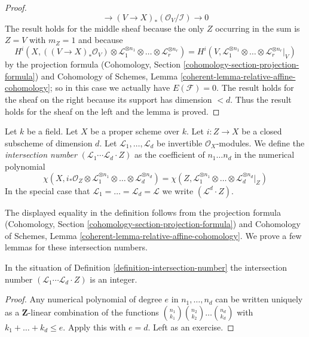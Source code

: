\begin{proof}
$$\to (V \to X)_*(\mathcal{O}_V/\mathcal{I}) \to 0
$$
The result holds for the middle sheaf because
the only $Z$ occurring in the sum is $Z = V$
with $m_Z = 1$ and because
$$
H^i(X, ((V \to X)_*\mathcal{O}_V) \otimes 
 \mathcal{L}_1^{\otimes n_1} \otimes \ldots \otimes
\mathcal{L}_r^{\otimes n_r}) =
H^i(V,  \mathcal{L}_1^{\otimes n_1} \otimes \ldots \otimes
\mathcal{L}_r^{\otimes n_r}|_V)
$$
by the projection formula
(Cohomology, Section \ref{cohomology-section-projection-formula}) and
Cohomology of Schemes, Lemma
\ref{coherent-lemma-relative-affine-cohomology};
so in this case we actually have $E(\mathcal{F}) = 0$.
The result holds for the sheaf on the right because its support
has dimension $< d$. Thus the result holds for the sheaf on the
left and the lemma is proved.
\end{proof}

\begin{definition}
\label{definition-intersection-number}
Let $k$ be a field. Let $X$ be a proper scheme over $k$. Let
$i : Z \to X$ be a closed subscheme of dimension $d$. Let
$\mathcal{L}_1, \ldots, \mathcal{L}_d$ be invertible
$\mathcal{O}_X$-modules. We define the {\it intersection number}
$(\mathcal{L}_1 \cdots \mathcal{L}_d \cdot Z)$
as the coefficient of $n_1 \ldots n_d$ in the numerical polynomial
$$
\chi(X, i_*\mathcal{O}_Z \otimes \mathcal{L}_1^{\otimes n_1} \otimes
\ldots \otimes \mathcal{L}_d^{\otimes n_d}) =
\chi(Z, \mathcal{L}_1^{\otimes n_1} \otimes
\ldots \otimes \mathcal{L}_d^{\otimes n_d}|_Z)
$$
In the special
case that $\mathcal{L}_1 = \ldots = \mathcal{L}_d = \mathcal{L}$
we write $(\mathcal{L}^d \cdot Z)$.
\end{definition}

\noindent
The displayed equality in the definition follows from
the projection formula
(Cohomology, Section \ref{cohomology-section-projection-formula}) and
Cohomology of Schemes, Lemma
\ref{coherent-lemma-relative-affine-cohomology}.
We prove a few lemmas for these intersection numbers.

\begin{lemma}
\label{lemma-intersection-number-integer}
In the situation of Definition \ref{definition-intersection-number}
the intersection number
$(\mathcal{L}_1 \cdots \mathcal{L}_d \cdot Z)$
is an integer.
\end{lemma}

\begin{proof}
Any numerical polynomial of degree $e$ in $n_1, \ldots, n_d$ can be
written uniquely as a $\mathbf{Z}$-linear combination of the functions
${n_1 \choose k_1}{n_2 \choose k_2} \ldots {n_d \choose k_d}$ with
$k_1 + \ldots + k_d \leq e$. Apply this with $e = d$.
Left as an exercise.
\end{proof}

